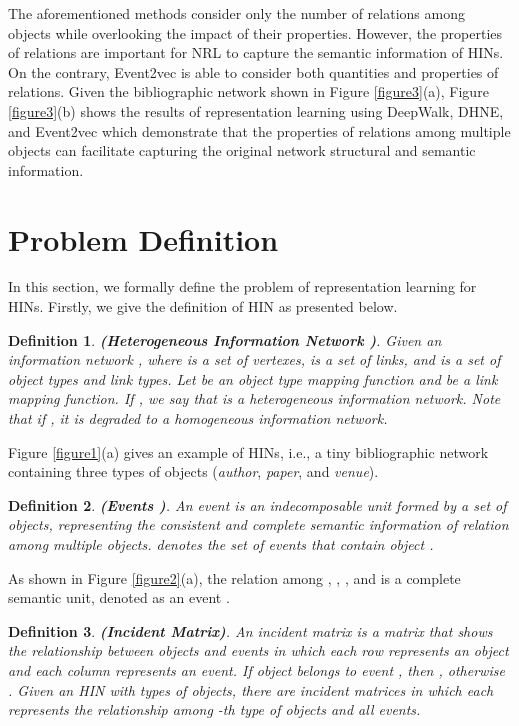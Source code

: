 The aforementioned methods consider only the number of relations among objects while overlooking the impact of their properties. However, the properties of relations are important for NRL to capture the semantic information of HINs. On the contrary, Event2vec is able to consider both quantities and properties of relations. Given the bibliographic network shown in Figure \ref{figure3}(a), Figure \ref{figure3}(b) shows the results of representation learning using DeepWalk, DHNE, and Event2vec which demonstrate that the properties of relations among multiple objects can facilitate capturing the original network structural and semantic information.

\section{Problem Definition}
In this section, we formally define the problem of representation learning for HINs. Firstly, we give the definition of HIN as presented below.
\smallskip

\newtheorem{mydef}{Definition}
\begin{mydef}
	\textbf{(Heterogeneous Information Network \cite{shi2017survey})}. Given an information network , where  is a set of vertexes,  is a set of links, and  is a set of object types and link types. Let  be an object type mapping function and  be a link mapping function. If , we say that  is a heterogeneous information network. Note that if , it is degraded to a homogeneous information network.
\end{mydef}

Figure \ref{figure1}(a) gives an example of HINs, i.e., a tiny bibliographic network containing three types of objects ({\itshape author}, {\itshape paper}, and {\itshape venue}).

\begin{mydef}
	\textbf{(Events \cite{gui2017embedding})}. An event  is an indecomposable unit formed by a set of objects, representing the consistent and complete semantic information of relation among multiple objects.  denotes the set of events that contain object .
\end{mydef}

As shown in Figure \ref{figure2}(a), the relation among , , , and  is a complete semantic unit, denoted as an event .

\begin{mydef}
	\textbf{(Incident Matrix)}. An incident matrix  is a matrix that shows the relationship between objects  and events  in which each row represents an object and each column represents an event. If object  belongs to event , then , otherwise . Given an HIN with  types of objects, there are  incident matrices  in which each  represents the relationship among -th type of objects and all events.
\end{mydef}

